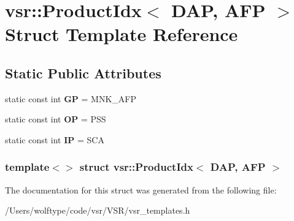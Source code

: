\hypertarget{structvsr_1_1_product_idx_3_01_d_a_p_00_01_a_f_p_01_4}{\section{vsr\-:\-:Product\-Idx$<$ D\-A\-P, A\-F\-P $>$ Struct Template Reference}
\label{structvsr_1_1_product_idx_3_01_d_a_p_00_01_a_f_p_01_4}
}
\subsection*{Static Public Attributes}
\begin{DoxyCompactItemize}
\item 
\hypertarget{structvsr_1_1_product_idx_3_01_d_a_p_00_01_a_f_p_01_4_a8f43a8a9ce3949c445712e4d71c2be12}{static const int {\bfseries G\-P} = M\-N\-K\-\_\-\-A\-F\-P}\label{structvsr_1_1_product_idx_3_01_d_a_p_00_01_a_f_p_01_4_a8f43a8a9ce3949c445712e4d71c2be12}

\item 
\hypertarget{structvsr_1_1_product_idx_3_01_d_a_p_00_01_a_f_p_01_4_af295c9e060797a815f76be3c7e8437f7}{static const int {\bfseries O\-P} = P\-S\-S}\label{structvsr_1_1_product_idx_3_01_d_a_p_00_01_a_f_p_01_4_af295c9e060797a815f76be3c7e8437f7}

\item 
\hypertarget{structvsr_1_1_product_idx_3_01_d_a_p_00_01_a_f_p_01_4_a2dc358ae894ed4439c1d2ede63545bac}{static const int {\bfseries I\-P} = S\-C\-A}\label{structvsr_1_1_product_idx_3_01_d_a_p_00_01_a_f_p_01_4_a2dc358ae894ed4439c1d2ede63545bac}

\end{DoxyCompactItemize}
\subsubsection*{template$<$$>$ struct vsr\-::\-Product\-Idx$<$ D\-A\-P, A\-F\-P $>$}



The documentation for this struct was generated from the following file\-:\begin{DoxyCompactItemize}
\item 
/\-Users/wolftype/code/vsr/\-V\-S\-R/vsr\-\_\-templates.\-h\end{DoxyCompactItemize}
